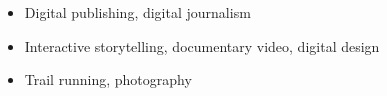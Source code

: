 \documentclass[a4paper,10pt]{memoir} %
\begin{document}





\begin{itemize}
	\item Digital publishing, digital journalism 
	\item Interactive storytelling, documentary video, digital design
	\item Trail running, photography
\end{itemize}

\Sep %

\end{document}
